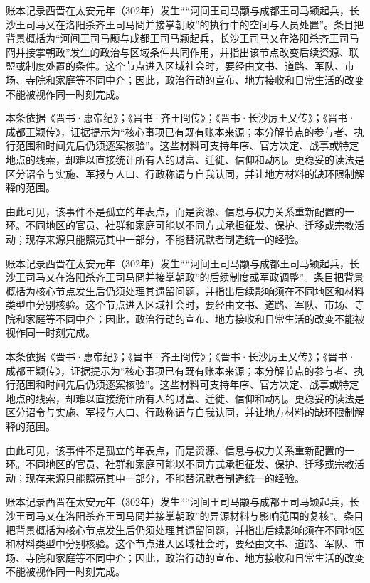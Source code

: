 账本记录西晋在太安元年（302年）发生““河间王司马颙与成都王司马颖起兵，长沙王司马乂在洛阳杀齐王司马冏并接掌朝政”的执行中的空间与人员处置”。条目把背景概括为“河间王司马颙与成都王司马颖起兵，长沙王司马乂在洛阳杀齐王司马冏并接掌朝政”发生的政治与区域条件共同作用，并指出该节点改变后续资源、联盟或制度处置的条件。这个节点进入区域社会时，要经由文书、道路、军队、市场、寺院和家庭等不同中介；因此，政治行动的宣布、地方接收和日常生活的改变不能被视作同一时刻完成。

本条依据《晋书·惠帝纪》；《晋书·齐王冏传》；《晋书·长沙厉王乂传》；《晋书·成都王颖传》，证据提示为“核心事项已有既有账本来源；本分解节点的参与者、执行范围和时间先后仍须逐案核验”。这些材料可支持年序、官方决定、战事或特定地点的线索，却难以直接统计所有人的财富、迁徙、信仰和动机。更稳妥的读法是区分诏令与实施、军报与人口、行政称谓与自我认同，并让地方材料的缺环限制解释的范围。

由此可见，该事件不是孤立的年表点，而是资源、信息与权力关系重新配置的一环。不同地区的官员、社群和家庭可能以不同方式承担征发、保护、迁移或宗教活动；现存来源只能照亮其中一部分，不能替沉默者制造统一的经验。

账本记录西晋在太安元年（302年）发生““河间王司马颙与成都王司马颖起兵，长沙王司马乂在洛阳杀齐王司马冏并接掌朝政”的后续制度或军政调整”。条目把背景概括为核心节点发生后仍须处理其遗留问题，并指出后续影响须在不同地区和材料类型中分别核验。这个节点进入区域社会时，要经由文书、道路、军队、市场、寺院和家庭等不同中介；因此，政治行动的宣布、地方接收和日常生活的改变不能被视作同一时刻完成。

本条依据《晋书·惠帝纪》；《晋书·齐王冏传》；《晋书·长沙厉王乂传》；《晋书·成都王颖传》，证据提示为“核心事项已有既有账本来源；本分解节点的参与者、执行范围和时间先后仍须逐案核验”。这些材料可支持年序、官方决定、战事或特定地点的线索，却难以直接统计所有人的财富、迁徙、信仰和动机。更稳妥的读法是区分诏令与实施、军报与人口、行政称谓与自我认同，并让地方材料的缺环限制解释的范围。

由此可见，该事件不是孤立的年表点，而是资源、信息与权力关系重新配置的一环。不同地区的官员、社群和家庭可能以不同方式承担征发、保护、迁移或宗教活动；现存来源只能照亮其中一部分，不能替沉默者制造统一的经验。

账本记录西晋在太安元年（302年）发生““河间王司马颙与成都王司马颖起兵，长沙王司马乂在洛阳杀齐王司马冏并接掌朝政”的异源材料与影响范围的复核”。条目把背景概括为核心节点发生后仍须处理其遗留问题，并指出后续影响须在不同地区和材料类型中分别核验。这个节点进入区域社会时，要经由文书、道路、军队、市场、寺院和家庭等不同中介；因此，政治行动的宣布、地方接收和日常生活的改变不能被视作同一时刻完成。

